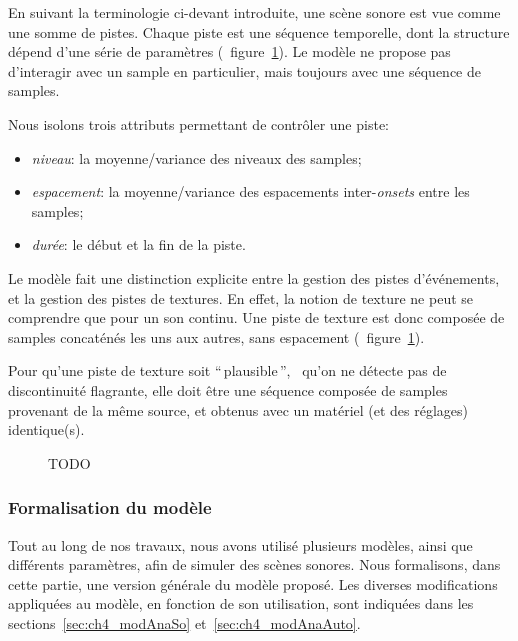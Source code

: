En suivant la terminologie ci-devant introduite, une scène sonore est vue comme une somme de pistes. Chaque piste est une séquence temporelle, dont la structure dépend d'une série de paramètres (\cf~figure~\ref{fig:modelSequence}). Le modèle ne propose pas d’interagir avec un sample en particulier, mais toujours avec une séquence de samples.

Nous isolons trois attributs permettant de contrôler une piste:

\begin{itemize}
\item \emph{niveau}: la moyenne/variance des niveaux des samples;
\item \emph{espacement}: la moyenne/variance des espacements inter-\emph{onsets} entre les samples;
\item \emph{durée}: le début et la fin de la piste.
\end{itemize}

Le modèle fait une distinction explicite entre la gestion des pistes d'événements, et la gestion des pistes de textures. En effet, la notion de texture ne peut se comprendre que pour un son continu. Une piste de texture est donc composée de samples concaténés les uns aux autres, sans espacement (\cf~figure~\ref{fig:modelSequence}). 

Pour qu'une piste de texture soit ``\,plausible\,'', \ie~qu'on ne détecte pas de discontinuité flagrante, elle doit être une séquence composée de samples provenant de la même source, et obtenus avec un matériel (et des réglages) identique(s).

\begin{figure}[t]
        \graphicspath{{gfx/}}
        \myfloatalign
        \def\svgwidth{\linewidth}
        
       \caption{TODO}\label{fig:modelSequence}
\end{figure}

\subsubsection{Formalisation du modèle}
 \label{sec:ch4_modelForm}
 
 Tout au long de nos travaux, nous avons utilisé plusieurs modèles, ainsi que différents paramètres, afin de simuler des scènes sonores. Nous formalisons, dans cette partie, une version générale du modèle proposé. Les diverses modifications appliquées au modèle, en fonction de son utilisation, sont indiquées dans les sections~\ref{sec:ch4_modAnaSo} et~\ref{sec:ch4_modAnaAuto}.
 
